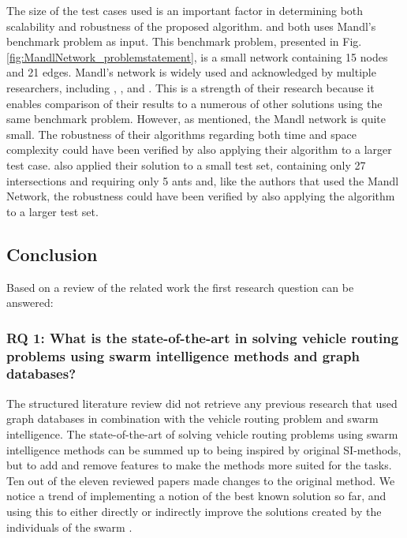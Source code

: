 The size of the test cases used is an important factor in determining both scalability and robustness of the proposed algorithm. \citet{nikolic14} and \citet{kechagiopoulos14} both uses Mandl's benchmark problem as input. This benchmark problem, presented in Fig. \vref{fig:MandlNetwork_problemstatement},  is a small network containing 15 nodes and 21 edges.  Mandl's network is widely used and acknowledged by multiple researchers, including \citet{baaj91}, \citet{chakroborty02}, and \citet{fan09}. This is a strength of their research because it enables comparison of their results to a numerous of other solutions using the same benchmark problem. However, as mentioned, the Mandl network is quite small. The robustness of their algorithms regarding both time and space complexity could have been verified by also applying their algorithm to a larger test case. \citet{salehi-nezhad07} also applied their solution to a small test set, containing only 27 intersections and requiring only 5 ants and, like the authors that used the Mandl Network, the robustness could have been verified by also applying the algorithm to a larger test set.  

\subsection{Conclusion}
\label{subsec:relatedWorkConclusion}

Based on a review of the related work the first research question can be answered:

\subsubsection*{RQ 1: What is the state-of-the-art in solving vehicle routing problems using swarm intelligence methods and graph databases?}

The structured literature review did not retrieve any previous research that used graph databases in combination with the vehicle routing problem and swarm intelligence. The state-of-the-art of solving vehicle routing problems using swarm intelligence methods can be summed up to  being inspired by original SI-methods, but to add and remove features to make the methods more suited for the tasks. Ten out of the eleven reviewed papers made changes to the original method. We notice a trend of implementing a notion of the best known solution so far, and using this to either directly or indirectly improve the solutions created by the individuals of the swarm \citep{tripathi09,sedighpour14,nikolic14}. 





